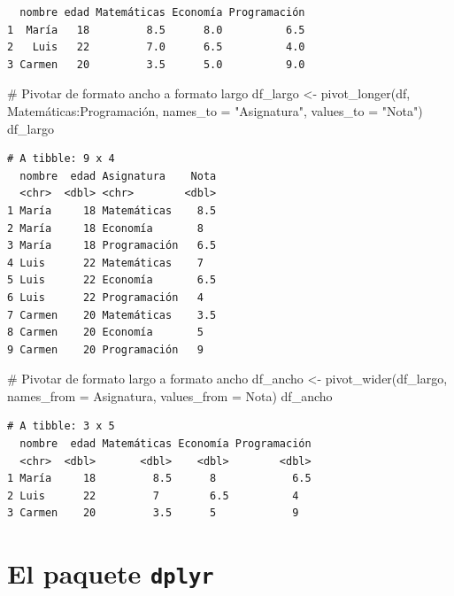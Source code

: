 \documentclass[
  a4paper,
]{scrreport}
\newenvironment{Shaded}{\begin{snugshade}}{\end{snugshade}}
\newcommand{\AttributeTok}[1]{\textcolor[rgb]{0.40,0.45,0.13}{#1}}
\newcommand{\CommentTok}[1]{\textcolor[rgb]{0.37,0.37,0.37}{#1}}
\newcommand{\FunctionTok}[1]{\textcolor[rgb]{0.28,0.35,0.67}{#1}}
\newcommand{\NormalTok}[1]{\textcolor[rgb]{0.00,0.23,0.31}{#1}}
\newcommand{\OtherTok}[1]{\textcolor[rgb]{0.00,0.23,0.31}{#1}}
\newcommand{\SpecialCharTok}[1]{\textcolor[rgb]{0.37,0.37,0.37}{#1}}
\newcommand{\StringTok}[1]{\textcolor[rgb]{0.13,0.47,0.30}{#1}}
\theoremstyle{definition}
\theoremstyle{definition}
\theoremstyle{remark}
\begin{document}
\begin{verbatim}
  nombre edad Matemáticas Economía Programación
1  María   18         8.5      8.0          6.5
2   Luis   22         7.0      6.5          4.0
3 Carmen   20         3.5      5.0          9.0
\end{verbatim}

\begin{Shaded}
\begin{Highlighting}[]
\CommentTok{\# Pivotar de formato ancho a formato largo}
\NormalTok{df\_largo }\OtherTok{\textless{}{-}} \FunctionTok{pivot\_longer}\NormalTok{(df, Matemáticas}\SpecialCharTok{:}\NormalTok{Programación, }\AttributeTok{names\_to =} \StringTok{"Asignatura"}\NormalTok{, }\AttributeTok{values\_to =} \StringTok{"Nota"}\NormalTok{)}
\NormalTok{df\_largo}
\end{Highlighting}
\end{Shaded}

\begin{verbatim}
# A tibble: 9 x 4
  nombre  edad Asignatura    Nota
  <chr>  <dbl> <chr>        <dbl>
1 María     18 Matemáticas    8.5
2 María     18 Economía       8  
3 María     18 Programación   6.5
4 Luis      22 Matemáticas    7  
5 Luis      22 Economía       6.5
6 Luis      22 Programación   4  
7 Carmen    20 Matemáticas    3.5
8 Carmen    20 Economía       5  
9 Carmen    20 Programación   9  
\end{verbatim}

\begin{Shaded}
\begin{Highlighting}[]
\CommentTok{\# Pivotar de formato largo a formato ancho}
\NormalTok{df\_ancho }\OtherTok{\textless{}{-}} \FunctionTok{pivot\_wider}\NormalTok{(df\_largo, }\AttributeTok{names\_from =}\NormalTok{ Asignatura, }\AttributeTok{values\_from =}\NormalTok{ Nota)}
\NormalTok{df\_ancho}
\end{Highlighting}
\end{Shaded}

\begin{verbatim}
# A tibble: 3 x 5
  nombre  edad Matemáticas Economía Programación
  <chr>  <dbl>       <dbl>    <dbl>        <dbl>
1 María     18         8.5      8            6.5
2 Luis      22         7        6.5          4  
3 Carmen    20         3.5      5            9  
\end{verbatim}

\hypertarget{el-paquete-dplyr}{%
\section{\texorpdfstring{El paquete
\texttt{dplyr}}{El paquete dplyr}}\label{el-paquete-dplyr}}
\end{document}
